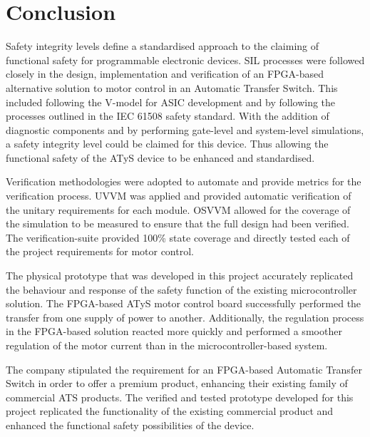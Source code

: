  \chapter{Conclusion}
\label{conclusion}


Safety integrity levels define a standardised approach to the claiming of functional safety for programmable electronic devices. SIL processes were followed closely in the design, implementation and verification of an FPGA-based alternative solution to motor control in an Automatic Transfer Switch. This included following the V-model for ASIC development and by following the processes outlined in the IEC 61508 safety standard.
With the addition of diagnostic components and by performing gate-level and system-level simulations, a safety integrity level could be claimed for this device. Thus allowing the functional safety of the ATyS device to be enhanced and standardised.

Verification methodologies were adopted to automate and provide metrics for the verification process. UVVM was applied and provided automatic verification of the unitary requirements for each module. OSVVM allowed for the coverage of the simulation to be measured to ensure that the full design had been verified. The verification-suite provided 100\% state coverage and directly tested each of the project requirements for motor control.

The physical prototype that was developed in this project accurately replicated the behaviour and response of the safety function of the existing microcontroller solution. The FPGA-based ATyS motor control board successfully performed the transfer from one supply of power to another. Additionally, the regulation process in the FPGA-based solution reacted more quickly and performed a smoother regulation of the motor current than in the microcontroller-based system.

The company stipulated the requirement for an FPGA-based Automatic Transfer Switch in order to offer a premium product, enhancing their existing family of commercial ATS products. The verified and tested prototype developed for this project replicated the functionality of the existing commercial product and enhanced the functional safety possibilities of the device. 